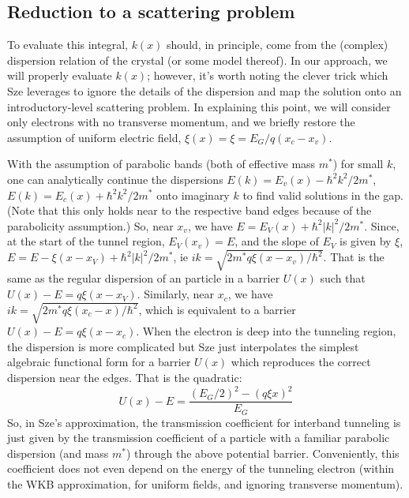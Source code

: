 \subsection{Reduction to a scattering problem}
To evaluate this integral, $k(x)$ should, in principle, come from the (complex) dispersion relation of the crystal (or some model thereof).  In our approach, we will properly evaluate $k(x)$; however, it's worth noting the clever trick which Sze leverages to ignore the details of the dispersion and map the solution onto an introductory-level scattering problem.  In explaining this point, we will consider only electrons with no transverse momentum, and we briefly restore the assumption of uniform electric field, $\xi(x)=\xi=E_G/q(x_c-x_v)$.

With the assumption of parabolic bands (both of effective mass $m^*$) for small $k$, one can  analytically continue the dispersions $E(k)=E_v(x)-\hbar^2k^2/2m^*$, $E(k)=E_c(x)+\hbar^2k^2/2m^*$ onto imaginary $k$ to find valid solutions in the gap.  (Note that this only holds near to the respective band edges because of the parabolicity assumption.)  So, near $x_v$, we have $E=E_V(x)+\hbar^2|k|^2/2m^*$.  Since, at the start of the tunnel region, $E_V(x_v)=E$, and the slope of $E_V$ is given by $\xi$, $E=E-\xi(x-x_V)+\hbar^2|k|^2/2m^*$, ie $ik=\sqrt{2m^*q\xi(x-x_v)/\hbar^2}$.  That is the same as the regular dispersion of an particle in a barrier $U(x)$ such that $U(x)-E=q\xi(x-x_V)$.  Similarly, near $x_c$, we have $ik=\sqrt{2m^*q\xi(x_c-x)/\hbar^2}$, which is equivalent to a barrier $U(x)-E=q\xi(x-x_c)$.  When the electron is deep into the tunneling region, the dispersion is more complicated but Sze just interpolates the simplest algebraic functional form for a barrier $U(x)$ which reproduces the correct dispersion near the edges.  That is the quadratic:
$$U(x)-E=\frac{(E_G/2)^2-(q\xi x)^2}{E_G}$$
So, in Sze's approximation, the transmission coefficient for interband tunneling is just given by the transmission coefficient of a particle with a familiar parabolic dispersion (and mass $m^*$) through the above potential barrier.  Conveniently, this coefficient does not even depend on the energy of the tunneling electron (within the WKB approximation, for uniform fields, and ignoring transverse momentum).